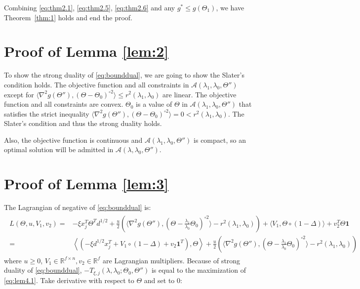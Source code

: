 Combining \eqref{eq:thm2.1}, \eqref{eq:thm2.5}, \eqref{eq:thm2.6} and any $g^*\leq g(\Theta_{1})$, we have Theorem~\ref{thm:1} holds and end the proof.

\hspace{0 in}

\section{Proof of Lemma \ref{lem:2}}
\label{sec:lem2proof}

To show the strong duality of \eqref{eq:bounddual}, we are going to show the Slater's condition holds. The objective function and all constraints in $\mathcal{A}(\lambda_1,{\lambda_0},\Theta'')$ except for $\langle\nabla^2 g(\Theta''),(\Theta-\Theta_{0})^{\circ 2}\rangle\leq r^2(\lambda_1,\lambda_0)$ are linear. The objective function and all constraints are convex. $\Theta_{0}$ is a value of $\Theta$ in $\mathcal{A}(\lambda_1,{\lambda_0},\Theta'')$ that satisfies the strict inequality $\langle\nabla^2 g(\Theta''),(\Theta-\Theta_{0})^{\circ 2}\rangle=0< r^2(\lambda_1,\lambda_0)$. The Slater's condition and thus the strong duality holds.

Also, the objective function is continuous and $\mathcal{A}(\lambda_1,{\lambda_0},\Theta'')$ is compact, so an optimal solution will be admitted in $\mathcal{A}(\lambda,{\lambda_0},\Theta'')$.


\section{Proof of Lemma \ref{lem:3}}
\label{sec:lem3proof}

The Lagrangian of negative of \eqref{eq:bounddual} is:
\begin{gather}
    \label{eq:lem4.1}
    \begin{aligned}
        L(\Theta,u,V_1,v_2)=&-\xi x_j^T\Theta^T d^{1/2}+\frac{u}{2}\left(\langle\nabla^2 g(\Theta''),(\Theta-\frac{\lambda_1}{\lambda_0}\Theta_{0})^{\circ 2}\rangle-r^2(\lambda_1,\lambda_0)\right)
        +\langle V_1,\Theta\circ(1-\Delta)\rangle+v_2^T\Theta\mathbf{1}\\
        =&\left\langle\left(-\xi d^{1/2}x_j^T+V_1\circ(1-\Delta)+v_2\mathbf{1}^T\right),\Theta\right\rangle+\frac{u}{2}\left(\langle\nabla^2 g(\Theta''),(\Theta-\frac{\lambda_1}{\lambda_0}\Theta_{0})^{\circ 2}\rangle-r^2(\lambda_1,\lambda_0)\right)
    \end{aligned}
\end{gather}
where $u\geq 0$, $V_1\in\mathbb{R}^{f\times n},v_2\in\mathbb{R}^f$ are Lagrangian multipliers. Because of strong duality of \eqref{eq:bounddual}, $-T_{\xi,j}(\lambda,\lambda_0;\Theta_{0},\Theta'')$ is equal to the maximization of \eqref{eq:lem4.1}. Take derivative with respect to $\Theta$ and set to 0:

